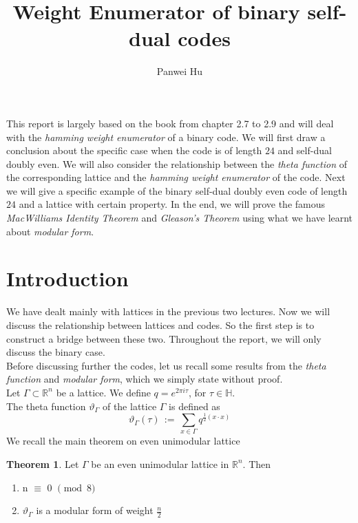 \documentclass[12pt]{article}
\title{Weight Enumerator of binary self-dual codes}
\author{Panwei Hu}
\theoremstyle{definition}
\newtheorem{theorem}{Theorem}[section]
\numberwithin{equation}{theorem}
\numberwithin{figure}{theorem}
\newcommand{\thetaFunction}[1]{\ensuremath{\vartheta_{#1}}}
\newcommand{\Real}{\ensuremath{\mathbb{R}}}
\newcommand{\imaginary}{\ensuremath{i}}
\newcommand{\HalfPlane}{\ensuremath{\mathbb{H}}}
\begin{document}
  \maketitle
  \newpage

\tableofcontents
	\newpage
  \newpage
\newpage

This report is largely based on the book \cite{ebeling2013lattices} from chapter 2.7 to 2.9 and will deal with the \emph{hamming weight enumerator} of a binary code. We will first draw a conclusion about the specific case when the code is of length $24$ and self-dual doubly even. We will also consider the relationship between the \emph{theta function} of the corresponding lattice and the \emph{hamming weight enumerator} of the code. Next we will give a specific example of the binary self-dual doubly even code of length $24$ and a lattice with certain property. In the end, we will prove the famous \emph{MacWilliams Identity Theorem} and \emph{Gleason's Theorem} using what we have learnt about \emph{modular form}.
\section{Introduction}
We have dealt mainly with lattices in the previous two lectures. Now we will discuss the relationship between lattices and codes. So the first step is to construct a bridge between these two. Throughout the report, we will only discuss the binary case.\\
Before discussing further the codes, let us recall some results from the \emph{theta function} and \emph{modular form}, which we simply state without proof.\\
Let $\Gamma \subset \Real^n$ be a lattice. We define $q = e^{2\pi\imaginary\tau}$, for $\tau \in \HalfPlane$.\\
The theta function $\thetaFunction{\Gamma}$ of the lattice $\Gamma$ is defined as 
\[
	\thetaFunction{\Gamma}(\tau) \, := \,\sum_{x \in \Gamma} q^{\frac{1}{2}(x\cdot x)} 
\] 
We recall the main theorem on even unimodular lattice
\begin{theorem}\label{evenUniLattice}
Let $\Gamma$ be an even unimodular lattice in $\Real^n$. Then
\begin{enumerate}
	\item n $\equiv$ 0 $\pmod 8$
	\item {\thetaFunction{\Gamma}} is a modular form of weight $\frac{n}{2}$
\end{enumerate}
\end{theorem}
\end{document}
